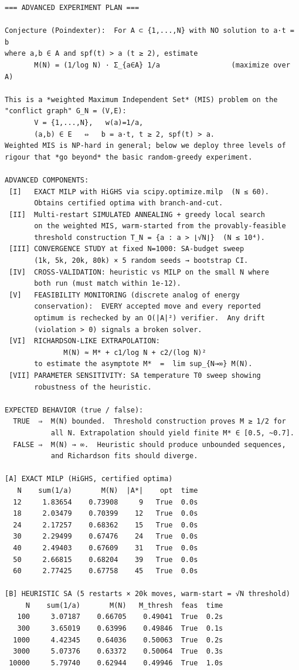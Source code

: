 \documentclass[11pt]{article}
\begin{document}
\begin{lstlisting}
=== ADVANCED EXPERIMENT PLAN ===

Conjecture (Poindexter):  For A ⊂ {1,...,N} with NO solution to a·t = b
where a,b ∈ A and spf(t) > a (t ≥ 2), estimate
       M(N) = (1/log N) · Σ_{a∈A} 1/a                 (maximize over A)

This is a *weighted Maximum Independent Set* (MIS) problem on the
"conflict graph" G_N = (V,E):
       V = {1,...,N},   w(a)=1/a,
       (a,b) ∈ E   ⇔   b = a·t, t ≥ 2, spf(t) > a.
Weighted MIS is NP-hard in general; below we deploy three levels of
rigour that *go beyond* the basic random-greedy experiment.

ADVANCED COMPONENTS:
 [I]   EXACT MILP with HiGHS via scipy.optimize.milp  (N ≤ 60).
       Obtains certified optima with branch-and-cut.
 [II]  Multi-restart SIMULATED ANNEALING + greedy local search
       on the weighted MIS, warm-started from the provably-feasible
       threshold construction T_N = {a : a > ⌊√N⌋}  (N ≤ 10⁴).
 [III] CONVERGENCE STUDY at fixed N=1000: SA-budget sweep
       (1k, 5k, 20k, 80k) × 5 random seeds → bootstrap CI.
 [IV]  CROSS-VALIDATION: heuristic vs MILP on the small N where
       both run (must match within 1e-12).
 [V]   FEASIBILITY MONITORING (discrete analog of energy
       conservation):  EVERY accepted move and every reported
       optimum is rechecked by an O(|A|²) verifier.  Any drift
       (violation > 0) signals a broken solver.
 [VI]  RICHARDSON-LIKE EXTRAPOLATION:
              M(N) ≈ M* + c1/log N + c2/(log N)²
       to estimate the asymptote M*  =  lim sup_{N→∞} M(N).
 [VII] PARAMETER SENSITIVITY: SA temperature T0 sweep showing
       robustness of the heuristic.

EXPECTED BEHAVIOR (true / false):
  TRUE  ⇒  M(N) bounded.  Threshold construction proves M ≥ 1/2 for
           all N. Extrapolation should yield finite M* ∈ [0.5, ~0.7].
  FALSE ⇒  M(N) → ∞.  Heuristic should produce unbounded sequences,
           and Richardson fits should diverge.

[A] EXACT MILP (HiGHS, certified optima)
   N    sum(1/a)       M(N)  |A*|    opt  time
  12     1.83654    0.73908     9   True  0.0s
  18     2.03479    0.70399    12   True  0.0s
  24     2.17257    0.68362    15   True  0.0s
  30     2.29499    0.67476    24   True  0.0s
  40     2.49403    0.67609    31   True  0.0s
  50     2.66815    0.68204    39   True  0.0s
  60     2.77425    0.67758    45   True  0.0s

[B] HEURISTIC SA (5 restarts × 20k moves, warm-start = √N threshold)
     N    sum(1/a)       M(N)   M_thresh  feas  time
   100     3.07187    0.66705    0.49041  True  0.2s
   300     3.65019    0.63996    0.49846  True  0.1s
  1000     4.42345    0.64036    0.50063  True  0.2s
  3000     5.07376    0.63372    0.50064  True  0.3s
 10000     5.79740    0.62944    0.49946  True  1.0s


\end{lstlisting}
\end{document}
